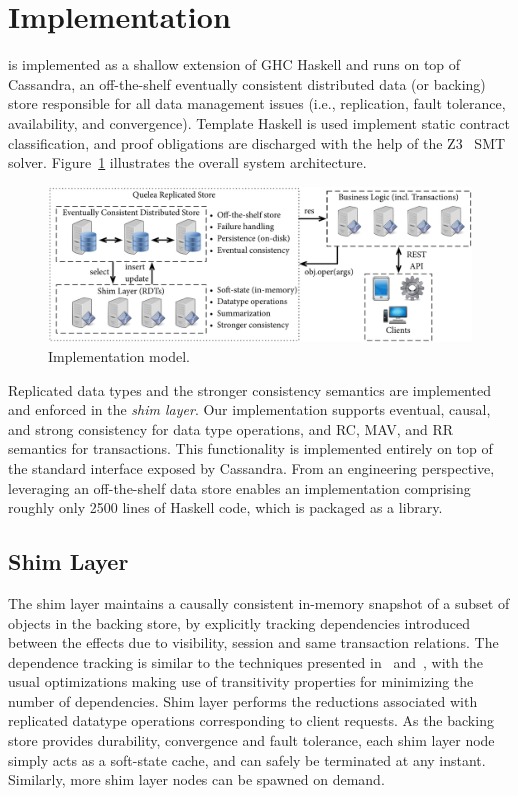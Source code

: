 \section{Implementation}
\label{q_sec:impl}

\quelea is implemented as a shallow extension of GHC Haskell and runs on top of
Cassandra, an off-the-shelf eventually consistent distributed data (or backing)
store responsible for all data management issues (i.e., replication, fault
tolerance, availability, and convergence).  Template Haskell is used implement
static contract classification, and proof obligations are discharged with the
help of the Z3~\cite{Z3} SMT solver. Figure~\ref{fig:impl_mod} illustrates the
overall system architecture.

\begin{figure}
\begin{center}
\includegraphics[width=\columnwidth]{Figures/ImplModel}
\end{center}
\caption{Implementation model.}
\label{fig:impl_mod}
\end{figure}

Replicated data types and the stronger consistency semantics are implemented
and enforced in the \emph{shim layer}. Our implementation supports eventual,
causal, and strong consistency for data type operations, and RC, MAV, and RR
semantics for transactions.  This functionality is implemented entirely on top
of the standard interface exposed by Cassandra. From an engineering
perspective, leveraging an off-the-shelf data store enables an implementation
comprising roughly only 2500 lines of Haskell code, which is packaged as a
library.

\subsection{Shim Layer}

The shim layer maintains a causally consistent in-memory snapshot of a subset
of objects in the backing store, by explicitly tracking dependencies introduced
between the effects due to visibility, session and same transaction relations.
The dependence tracking is similar to the techniques presented in~\cite{BoltOn}
and~\cite{Eiger}, with the usual optimizations making use of transitivity
properties for minimizing the number of dependencies. Shim layer performs the
reductions associated with replicated datatype operations corresponding to
client requests. As the backing store provides durability, convergence and
fault tolerance, each shim layer node simply acts as a soft-state cache, and
can safely be terminated at any instant. Similarly, more shim layer nodes can
be spawned on demand.

